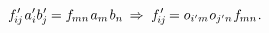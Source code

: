\nopagebreak\vspace{-0.15em}\begin{equation*}
f\hspace{.1ex}'_{\hspace{-0.5ex}i\hspace{-0.1ex}j} \hspace{.2ex} a'_i b\hspace{.1ex}'_{\hspace{-0.2ex}j} \hspace{-0.1ex} = f_{\hspace{-0.1ex}mn} \hspace{.4ex} \tikzmark{beginComponentOfFirstVector} \hspace{-0.2ex} a_m \tikzmark{endComponentOfFirstVector} \hspace{.2ex} \tikzmark{beginComponentOfSecondVector} b_n \hspace{-0.2ex} \tikzmark{endComponentOfSecondVector}
\;\Rightarrow\;
f\hspace{.1ex}'_{\hspace{-0.5ex}i\hspace{-0.1ex}j} \hspace{-0.2ex} = \cosinematrix{i'm} \hspace{.1ex} \cosinematrix{j'n} \hspace{.16ex} f_{\hspace{-0.1ex}mn}
\hspace{.1ex} .
\end{equation*}

